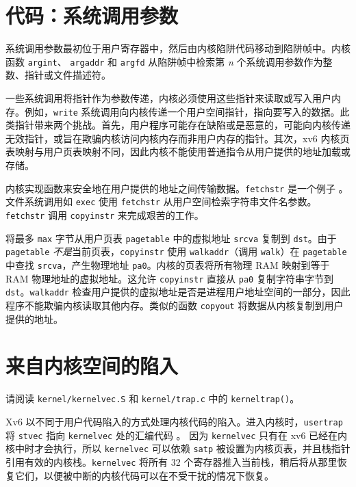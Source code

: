 \section{代码：系统调用参数}

系统调用参数最初位于用户寄存器中，然后由内核陷阱代码移动到陷阱帧中。内核函数
\lstinline{argint}、
\lstinline{argaddr}
和
\lstinline{argfd}
从陷阱帧中检索第
\textit{n}
个系统调用参数作为整数、指针或文件描述符。

一些系统调用将指针作为参数传递，内核必须使用这些指针来读取或写入用户内存。例如，{\tt write} 系统调用向内核传递一个用户空间指针，指向要写入的数据。此类指针带来两个挑战。首先，用户程序可能存在缺陷或是恶意的，可能向内核传递无效指针，或旨在欺骗内核访问内核内存而非用户内存的指针。其次，xv6 内核页表映射与用户页表映射不同，因此内核不能使用普通指令从用户提供的地址加载或存储。

内核实现函数来安全地在用户提供的地址之间传输数据。{\tt fetchstr} 是一个例子 。
文件系统调用如
{\tt exec} 使用 {\tt fetchstr} 从用户空间检索字符串文件名参数。
\lstinline{fetchstr} 调用 \lstinline{copyinstr}
来完成艰苦的工作。

 将最多 \lstinline{max} 字节从用户页表 \lstinline{pagetable} 中的虚拟地址 \lstinline{srcva} 复制到 \lstinline{dst}。由于 \lstinline{pagetable} \textit{不是}当前页表，\lstinline{copyinstr} 使用 {\tt walkaddr}（调用 {\tt walk}）在 \lstinline{pagetable} 中查找 \lstinline{srcva}，产生物理地址 \lstinline{pa0}。内核的页表将所有物理 RAM 映射到等于 RAM 物理地址的虚拟地址。这允许 {\tt copyinstr} 直接从 {\tt pa0} 复制字符串字节到 {\tt dst}。{\tt walkaddr}
检查用户提供的虚拟地址是否是进程用户地址空间的一部分，因此程序不能欺骗内核读取其他内存。类似的函数 {\tt copyout} 将数据从内核复制到用户提供的地址。

\section{来自内核空间的陷入}
\label{s:ktraps}

请阅读 {\tt kernel/kernelvec.S} 和 {\tt kernel/trap.c} 中的 {\tt kerneltrap()}。

Xv6 以不同于用户代码陷入的方式处理内核代码的陷入。进入内核时，{\tt usertrap} 将 {\tt stvec} 指向 {\tt kernelvec} 处的汇编代码
。
因为 {\tt kernelvec} 只有在 xv6 已经在内核中时才会执行，所以 {\tt kernelvec} 可以依赖 {\tt satp} 被设置为内核页表，并且栈指针引用有效的内核栈。{\tt kernelvec} 将所有 32 个寄存器推入当前栈，稍后将从那里恢复它们，以便被中断的内核代码可以在不受干扰的情况下恢复。

